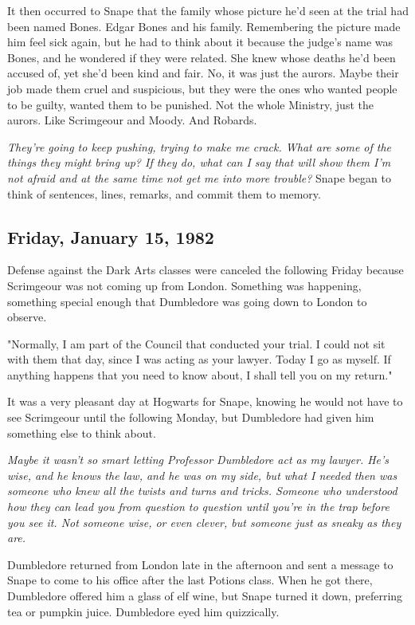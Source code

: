 It then occurred to Snape that the family whose picture he'd seen at the trial had been named Bones. Edgar Bones and his family. Remembering the picture made him feel sick again, but he had to think about it because the judge's name was Bones, and he wondered if they were related. She knew whose deaths he'd been accused of, yet she'd been kind and fair. No, it was just the aurors. Maybe their job made them cruel and suspicious, but they were the ones who wanted people to be guilty, wanted them to be punished. Not the whole Ministry, just the aurors. Like Scrimgeour and Moody. And Robards.

\emph{They're going to keep pushing, trying to make me crack. What are some of the things they might bring up? If they do, what can I say that will show them I'm not afraid and at the same time not get me into more trouble?} Snape began to think of sentences, lines, remarks, and commit them to memory.

\subsection{Friday, January 15, 1982}

Defense against the Dark Arts classes were canceled the following Friday because Scrimgeour was not coming up from London. Something was happening, something special enough that Dumbledore was going down to London to observe.

"Normally, I am part of the Council that conducted your trial. I could not sit with them that day, since I was acting as your lawyer. Today I go as myself. If anything happens that you need to know about, I shall tell you on my return."

It was a very pleasant day at Hogwarts for Snape, knowing he would not have to see Scrimgeour until the following Monday, but Dumbledore had given him something else to think about.

\emph{Maybe it wasn't so smart letting Professor Dumbledore act as my lawyer. He's wise, and he knows the law, and he was on my side, but what I needed then was someone who knew all the twists and turns and tricks. Someone who understood how they can lead you from question to question until you're in the trap before you see it. Not someone wise, or even clever, but someone just as sneaky as they are.}

Dumbledore returned from London late in the afternoon and sent a message to Snape to come to his office after the last Potions class. When he got there, Dumbledore offered him a glass of elf wine, but Snape turned it down, preferring tea or pumpkin juice. Dumbledore eyed him quizzically.

